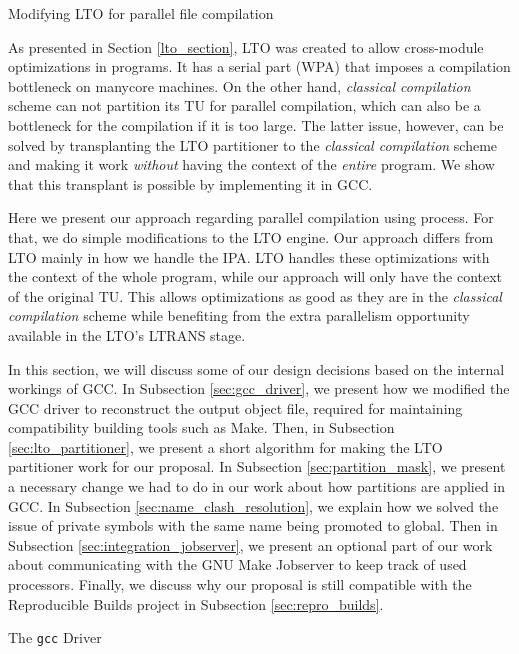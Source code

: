 \begin{section}{Modifying LTO for parallel file compilation}\label{sec:parallel_lto}

As presented in Section \ref{lto_section}, LTO was created to allow
cross-module optimizations in programs. It has a serial part (WPA) that imposes a
compilation bottleneck on manycore machines. On the other hand, \emph{classical
compilation} scheme can not partition its TU for parallel compilation, which
can also be a bottleneck for the compilation if it is too large.  The latter
issue, however, can be solved by transplanting the LTO partitioner to the
\emph{classical compilation} scheme and making it work \textit{without} having
the context of the \textit{entire} program. We show that this transplant is
possible by implementing it in GCC.

Here we present our approach regarding parallel compilation using process. For
that, we do simple modifications to the LTO engine.  Our approach differs from
LTO mainly in how we handle the IPA.  LTO handles these optimizations with the
context of the whole program, while our approach will only have the context of
the original TU.  This allows optimizations as good as they are in the
\emph{classical compilation} scheme while benefiting from the extra parallelism
opportunity available in the LTO's LTRANS stage.

In this section, we will discuss some of our design decisions based on the
internal workings of GCC. In Subsection \ref{sec:gcc_driver}, we present how we
modified the GCC driver to reconstruct the output object file, required for
maintaining compatibility building tools such as Make. Then, in
Subsection \ref{sec:lto_partitioner}, we present a short algorithm for making
the LTO partitioner work for our proposal. In Subsection
\ref{sec:partition_mask}, we present a necessary change we had to do in our work
about how partitions are applied in GCC. In
Subsection \ref{sec:name_clash_resolution}, we explain how we solved the issue
of private symbols with the same name being promoted to global.
Then in Subsection \ref{sec:integration_jobserver}, we present an optional part
of our work about communicating with the GNU Make Jobserver to keep track of
used processors. Finally, we discuss why our proposal is still compatible
with the Reproducible Builds project in Subsection \ref{sec:repro_builds}.

\begin{subsection}{The \texttt{gcc} Driver}\label{sec:gcc_driver}


\end{subsection}
\end{section}
